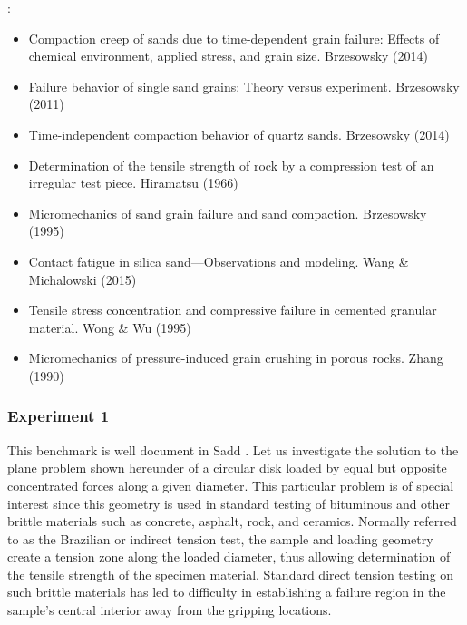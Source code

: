 

\noindent \Literature:
\begin{itemize}
\item Compaction creep of sands due to time-dependent grain failure: Effects of chemical environment,
      applied stress, and grain size. Brzesowsky \etal{} (2014) \cite{brhb14}
\item Failure behavior of single sand grains: Theory versus experiment. Brzesowsky \etal{} (2011) \cite{brsp11}
\item Time-independent compaction behavior of quartz sands. Brzesowsky \etal{} (2014) \cite{brsp14}
\item Determination of the tensile strength of rock by a compression test of an 
      irregular test piece. Hiramatsu \etal{} (1966) \cite{hiok66}
\item Micromechanics of sand grain failure and sand compaction. Brzesowsky (1995) \cite{brze95}
\item Contact fatigue in silica sand—Observations and modeling. Wang \& Michalowski (2015) \cite{wami15}
\item Tensile stress concentration and compressive failure in cemented granular material. 
      Wong \& Wu (1995)\cite{wowu95}
\item Micromechanics of pressure-induced grain crushing in porous rocks. Zhang \etal{} (1990) \cite{zhwd90}
\end{itemize}

\subsubsection*{Experiment 1}

This benchmark is well document in Sadd \cite{sadd14}.
Let us investigate the solution to the plane problem shown hereunder of a circular disk 
loaded by equal but opposite concentrated forces along a given diameter. 
This particular problem is of special interest since this geometry is used 
in standard testing of bituminous and other brittle materials such as 
concrete, asphalt, rock, and ceramics. Normally referred to as the Brazilian or indirect tension test, 
the sample and loading geometry create a tension zone along the loaded diameter, 
thus allowing determination of the tensile strength of the specimen material. 
Standard direct tension testing on such brittle materials has led to difficulty 
in establishing a failure region in the sample’s central interior away from 
the gripping locations.

